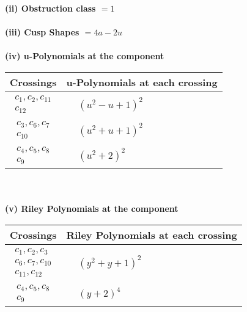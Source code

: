 \documentclass[1p]{elsarticle_modified}
\theoremstyle{definition}
\begin{document}
\flushleft \textbf{(ii) Obstruction class $= 1$}\\~\\
\flushleft \textbf{(iii) Cusp Shapes $= 4 a-2 u$}\\~\\
\newpage\renewcommand{\arraystretch}{1}
\flushleft \textbf{(iv) u-Polynomials at the component}\newline \\
\begin{tabular}{m{50pt}|m{274pt}}
Crossings & \hspace{64pt}u-Polynomials at each crossing \\
\hline $$\begin{aligned}c_{1},c_{2},c_{11}\\c_{12}\end{aligned}$$&$\begin{aligned}
&(u^2- u+1)^2
\end{aligned}$\\
\hline $$\begin{aligned}c_{3},c_{6},c_{7}\\c_{10}\end{aligned}$$&$\begin{aligned}
&(u^2+u+1)^2
\end{aligned}$\\
\hline $$\begin{aligned}c_{4},c_{5},c_{8}\\c_{9}\end{aligned}$$&$\begin{aligned}
&(u^2+2)^2
\end{aligned}$\\
\hline
\end{tabular}\\~\\
\newpage\renewcommand{\arraystretch}{1}
\flushleft \textbf{(v) Riley Polynomials at the component}\newline \\
\begin{tabular}{m{50pt}|m{274pt}}
Crossings & \hspace{64pt}Riley Polynomials at each crossing \\
\hline $$\begin{aligned}c_{1},c_{2},c_{3}\\c_{6},c_{7},c_{10}\\c_{11},c_{12}\end{aligned}$$&$\begin{aligned}
&(y^2+y+1)^2
\end{aligned}$\\
\hline $$\begin{aligned}c_{4},c_{5},c_{8}\\c_{9}\end{aligned}$$&$\begin{aligned}
&(y+2)^4
\end{aligned}$\\
\hline
\end{tabular}\\~\\
\end{document}
